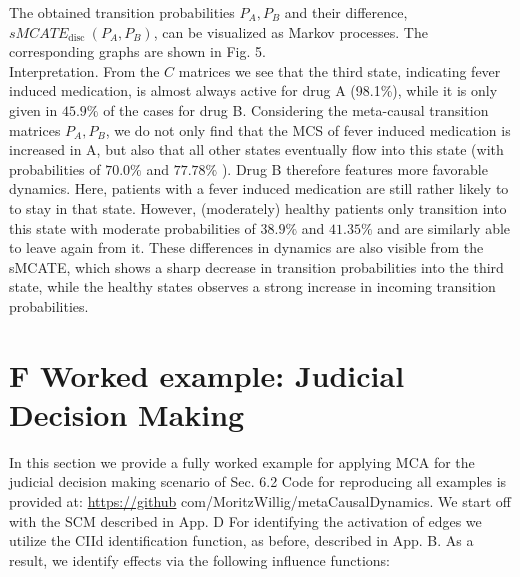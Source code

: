 \documentclass[10pt]{article}
\begin{document}
The obtained transition probabilities $P_{A}, P_{B}$ and their difference, $s M C A T E_{\text {disc }}\left(P_{A}, P_{B}\right)$, can be visualized as Markov processes. The corresponding graphs are shown in Fig. 5.\\
Interpretation. From the $C$ matrices we see that the third state, indicating fever induced medication, is almost always active for drug A (98.1\%), while it is only given in $45.9 \%$ of the cases for drug B. Considering the meta-causal transition matrices $P_{A}, P_{B}$, we do not only find that the MCS of fever induced medication is increased in A, but also that all other states eventually flow into this state (with probabilities of $70.0 \%$ and $77.78 \%$ ). Drug B therefore features more favorable dynamics. Here, patients with a fever induced medication are still rather likely to to stay in that state. However, (moderately) healthy patients only transition into this state with moderate probabilities of $38.9 \%$ and $41.35 \%$ and are similarly able to leave again from it. These differences in dynamics are also visible from the sMCATE, which shows a sharp decrease in transition probabilities into the third state, while the healthy states observes a strong increase in incoming transition probabilities.

\section*{F Worked example: Judicial Decision Making}
In this section we provide a fully worked example for applying MCA for the judicial decision making scenario of Sec. 6.2 Code for reproducing all examples is provided at: \href{https://github}{https://github} com/MoritzWillig/metaCausalDynamics. We start off with the SCM described in App. D For identifying the activation of edges we utilize the CIId identification function, as before, described in App. B. As a result, we identify effects via the following influence functions:
\end{document}

